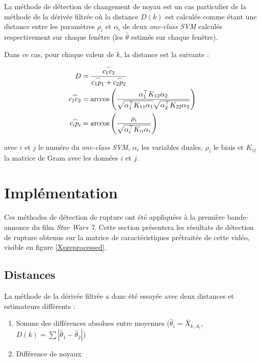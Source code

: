 La méthode de détection de changement de noyau est un cas particulier de la méthode de la dérivée filtrée où la distance $D(k)$ est calculée comme étant une distance entre les paramètres $\rho_i$ et $\alpha_i$ de deux \textit{one-class SVM} calculés respectivement sur chaque fenêtre (les $\hat{\theta}$ estimés sur chaque fenêtre).

Dans ce cas, pour chaque valeur de $k$, la distance est la suivante :

\begin{align}
  D &= \frac{\overset{\frown}{c_1 c_2}}{\overset{\frown}{c_1 p_1} + \overset{\frown}{c_2 p_2}} \notag \\
  \overset{\frown}{c_1 c_2} &= \arccos\left(\frac{
  	\alpha_1^\top K_{12} \alpha_2
  	}{
  	\sqrt{\alpha_1^\top K_{11} \alpha_1} \sqrt{\alpha_2^\top K_{22} \alpha_2}
  	} \right) \notag \\
  \overset{\frown}{c_i p_i} &= \arccos\left( \frac{\rho_i}{\sqrt{\alpha_i^\top K_{ii} \alpha_i}}  \right) \notag
\end{align}

avec $i$ et $j$ le numéro du \textit{one-class SVM}, $\alpha_i$ les variables duales, $\rho_i$ le biais et $K_{ij}$ la matrice de Gram avec les données $i$ et $j$.

\section{Implémentation}

Ces méthodes de détection de rupture ont été appliquées à la première bande-annonce du film \textit{Star Wars 7}. Cette section présentera les résultats de détection de rupture obtenus sur la matrice de caractéristiques prétraitée de cette vidéo, visible en figure \ref{Xpreprocessed}.

\subsection{Distances}

La méthode de la dérivée filtrée a donc été essayée avec deux distances et estimateurs différents :

\begin{enumerate}
\item Somme des différences absolues entre moyennes ($\hat{\theta}_i = \bar{X}_{k,A_i}$, $D(k) = \sum |\hat{\theta}_1 - \hat{\theta}_2|$)
\item Différence de noyaux
\end{enumerate}

